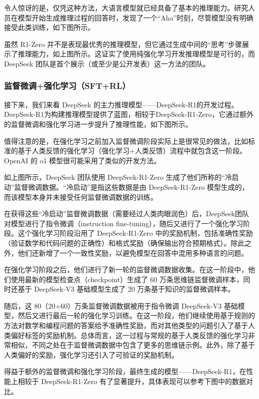 \documentclass[lang=cn,newtx,10pt,scheme=chinese]{elegantbook}
\begin{document}
令人惊讶的是，仅凭这种方法，大语言模型就已经具备了基本的推理能力。研究人员在模型开始生成推理过程的回答时，发现了一个``Aha''时刻，尽管模型没有明确接受此类训练，如下图所示。

虽然 R1-Zero 并不是表现最优秀的推理模型，但它通过生成中间的``思考''步骤展示了推理能力，如上图所示。这证实了使用纯强化学习开发推理模型是可行的，而 DeepSeek 团队是首个展示（或至少是公开发表）这一方法的团队。

\subsubsection{监督微调+强化学习（SFT+RL）}

接下来，我们来看 DeepSeek 的主力推理模型——DeepSeek-R1的开发过程。DeepSeek-R1为构建推理模型提供了蓝图，相较于DeepSeek-R1-Zero，它通过额外的监督微调和强化学习进一步提升了推理性能，如下图所示。

值得注意的是，在强化学习之前加入监督微调阶段实际上是很常见的做法，比如标准的基于人类反馈的强化学习（强化学习+人类反馈）流程中就包含这一阶段。OpenAI 的 o1 模型很可能采用了类似的开发方法。

如上图所示，DeepSeek 团队使用 DeepSeek-R1-Zero 生成了他们所称的``冷启动''监督微调数据。``冷启动''是指这些数据是由 DeepSeek-R1-Zero 模型生成的，而该模型本身并未接受任何监督微调数据的训练。

在获得这些``冷启动''监督微调数据（需要经过人类肉眼润色）后，DeepSeek团队对模型进行了指令微调（instruction fine-tuning），随后又进行了一个强化学习阶段。这个强化学习阶段沿用了 DeepSeek-R1-Zero 中的奖励机制，包括准确性奖励（验证数学和代码问题的正确性）和格式奖励（确保输出符合预期格式）。除此之外，他们还新增了一个一致性奖励，以避免模型在回答中混用多种语言的问题。

在强化学习阶段之后，他们进行了新一轮的监督微调数据收集。在这一阶段中，他们使用最新的模型检查点（checkpoint）生成了 60 万条思维链监督微调样本，同时还基于 DeepSeek-V3 基础模型生成了 20 万条基于知识的监督微调样本。

随后，这 80（20+60）万条监督微调数据被用于指令微调 DeepSeek-V3 基础模型，然后又进行最后一轮的强化学习训练。在这一阶段，他们继续使用基于规则的方法对数学和编程问题的答案给予准确性奖励，而对其他类型的问题引入了基于人类偏好标签的奖励机制。总体而言，这一过程与常规的基于人类反馈的强化学习非常相似，不同之处在于监督微调数据中包含了更多的思维链示例。此外，除了基于人类偏好的奖励，强化学习还引入了可验证的奖励机制。

得益于额外的监督微调和强化学习阶段，最终生成的模型——DeepSeek-R1，在性能上相较于 DeepSeek-R1-Zero 有了显著提升，具体表现可以参考下图中的数据对比。
\end{document}
